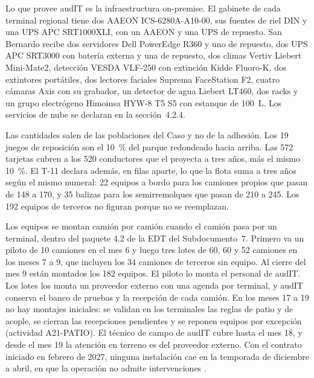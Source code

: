 Lo que provee audIT es la infraestructura on-premise. El gabinete de cada terminal regional tiene dos
AAEON ICS-6280A-A10-00, sus fuentes de riel DIN y una UPS APC SRT1000XLI, con un AAEON y una UPS
de repuesto. San Bernardo recibe dos servidores Dell PowerEdge R360 y uno de repuesto, dos UPS APC
SRT3000 con batería externa y una de repuesto, dos climas Vertiv Liebert Mini-Mate2, detección VESDA
VLF-250 con extinción Kidde Fluoro-K, dos extintores portátiles, dos lectores faciales Suprema
FaceStation F2, cuatro cámaras Axis con su grabador, un detector de agua Liebert LT460, dos racks y un
grupo electrógeno Himoinsa HYW-8 T5 S5 con estanque de 100~L. Los
servicios de nube se declaran en la sección~4.2.4.

Las cantidades salen de las poblaciones del Caso y no de la adhesión. Los 19 juegos de reposición son el
10~\% del parque redondeado hacia arriba. Las 572 tarjetas cubren a los 520 conductores que el
 proyecta a tres años, más el mismo 10~\%. El T-11 declara además, en filas
aparte, lo que la flota suma a tres años según el mismo numeral: 22 equipos a bordo para los camiones
propios que pasan de 148 a 170, y 35 balizas para los semirremolques que pasan de 210 a 245. Los 192
equipos de terceros no figuran porque no se reemplazan.

Los equipos se montan camión por camión cuando el camión pasa por un terminal, dentro del paquete 4.2
de la EDT del Subdocumento~7. Primero va un piloto de 10 camiones en el mes 6 y luego tres lotes de 60,
60 y 52 camiones en los meses 7 a 9, que incluyen los 34 camiones de terceros sin equipo. Al cierre del
mes 9 están montados los 182 equipos. El piloto lo monta el personal de audIT. Los lotes los monta un
proveedor externo con una agenda por terminal, y audIT conserva el banco de pruebas y la recepción de
cada camión. En los meses 17 a 19 no hay montajes iniciales: se validan en los terminales las reglas de
patio y de acople, se cierran las recepciones pendientes y se reponen equipos por excepción
(actividad A21-PATIO). El técnico de campo de audIT cubre hasta el mes 18, y desde el mes 19 la atención
en terreno es del proveedor externo. Con el contrato iniciado en febrero de 2027, ninguna instalación cae en la
temporada de diciembre a abril, en que la operación no admite intervenciones .

